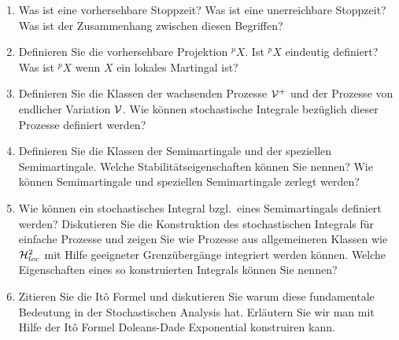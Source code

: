 \documentclass[11pt,oneside]{amsart}
\newcommand{\pp}[1]{\phantom{}^{p}#1}
\begin{document}
\begin{enumerate}
    \item Was ist eine vorhersehbare Stoppzeit? Was ist eine unerreichbare Stoppzeit? 
        Was ist der Zusammenhang zwischen diesen Begriffen? 

    \item Definieren Sie die vorhersehbare Projektion $\pp{X}$. Ist $\pp{X}$ eindeutig
        definiert? Was ist $\pp{X}$ wenn $X$ ein lokales Martingal ist?

    \item Definieren Sie die Klassen der wachsenden Prozesse $\mathcal V^{+}$ und der
        Prozesse von endlicher Variation $\mathcal V$. Wie können stochastische Integrale
        bezüglich dieser Prozesse definiert werden?

    \item Definieren Sie die Klassen der Semimartingale und der speziellen Semimartingale. 
        Welche Stabilitätseigenschaften können Sie nennen? Wie können Semimartingale und
        speziellen Semimartingale zerlegt werden?

    \item Wie können ein stochastisches Integral bzgl.\ eines Semimartingals
        definiert werden?  Diskutieren Sie die Konstruktion des stochastischen
        Integrals für einfache Prozesse und zeigen Sie wie Prozesse aus
        allgemeineren Klassen wie $\mathcal H^{2}_{loc}$ mit Hilfe geeigneter
        Grenzübergänge integriert werden können. Welche Eigenschaften eines so
        konstruierten Integrals können Sie nennen?

    \item Zitieren Sie die It\^o Formel und diskutieren Sie warum diese fundamentale Bedeutung
        in der Stochastischen Analysis hat. Erläutern Sie wir man mit Hilfe der It\^o Formel 
        Doleans-Dade Exponential konstruiren kann. 

\end{enumerate}
\end{document}
